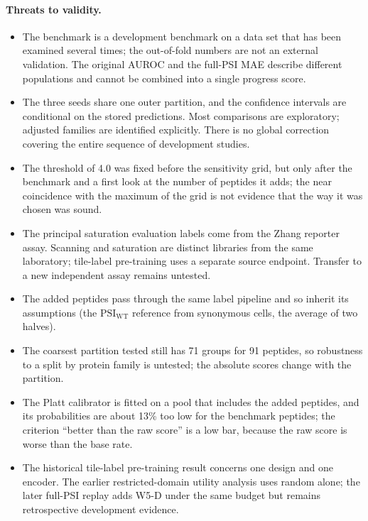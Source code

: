 \paragraph{Threats to validity.}
\begin{itemize}
  \item The benchmark is a development benchmark on a data set that has been examined several times; the
        out-of-fold numbers are not an external validation. The original AUROC and the full-PSI MAE
        describe different populations and cannot be combined into a single progress score.
  \item The three seeds share one outer partition, and the confidence intervals are conditional on the stored
        predictions. Most comparisons are exploratory; adjusted families are identified explicitly.
        There is no global correction covering the entire sequence of development studies.
  \item The threshold of 4.0 was fixed before the sensitivity grid, but only after the benchmark and a first
        look at the number of peptides it adds; the near coincidence with the maximum of the grid is not evidence that the way it was chosen was sound.
  \item The principal saturation evaluation labels come from the Zhang reporter assay. Scanning and
        saturation are distinct libraries from the same laboratory; tile-label pre-training uses a separate
        source endpoint. Transfer to a new independent assay remains untested.
  \item The added peptides pass through the same label pipeline and so inherit its assumptions (the $\mathrm{PSI}_{\mathrm{WT}}$
        reference from synonymous cells, the average of two halves).
  \item The coarsest partition tested still has 71 groups for 91 peptides, so robustness to a split by protein family is untested; the
        absolute scores change with the partition.
  \item The Platt calibrator is fitted on a pool that includes the added peptides, and its probabilities are about 13\% too low for the
        benchmark peptides; the criterion ``better than the raw score'' is a low bar, because the raw score is worse than the base rate.
  \item The historical tile-label pre-training result concerns one design and one encoder.
        The earlier restricted-domain utility analysis uses random alone; the later full-PSI replay
        adds W5-D under the same budget but remains retrospective development evidence.
\end{itemize}

